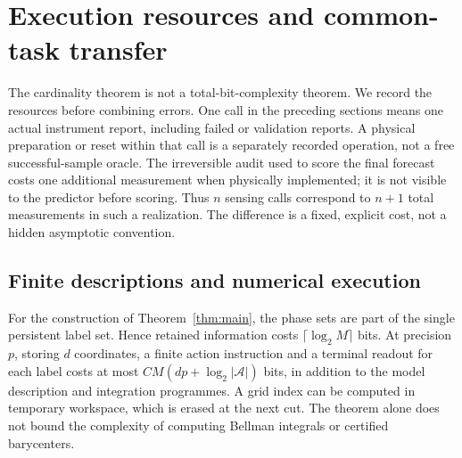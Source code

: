 \section{Execution resources and common-task transfer}\label{sec:resources}
The cardinality theorem is not a total-bit-complexity theorem. We record the resources before combining errors. One call in the preceding sections means one actual instrument report, including failed or validation reports. A physical preparation or reset within that call is a separately recorded operation, not a free successful-sample oracle. The irreversible audit used to score the final forecast costs one additional measurement when physically implemented; it is not visible to the predictor before scoring. Thus $n$ sensing calls correspond to $n+1$ total measurements in such a realization. The difference is a fixed, explicit cost, not a hidden asymptotic convention.

\subsection{Finite descriptions and numerical execution}
For the construction of Theorem~\ref{thm:main}, the phase sets are part of the single persistent label set. Hence retained information costs $\lceil\log_2M\rceil$ bits. At precision $p$, storing $d$ coordinates, a finite action instruction and a terminal readout for each label costs at most $C M(dp+\log_2|\mathcal A|)$ bits, in addition to the model description and integration programmes. A grid index can be computed in temporary workspace, which is erased at the next cut. The theorem alone does not bound the complexity of computing Bellman integrals or certified barycenters.

